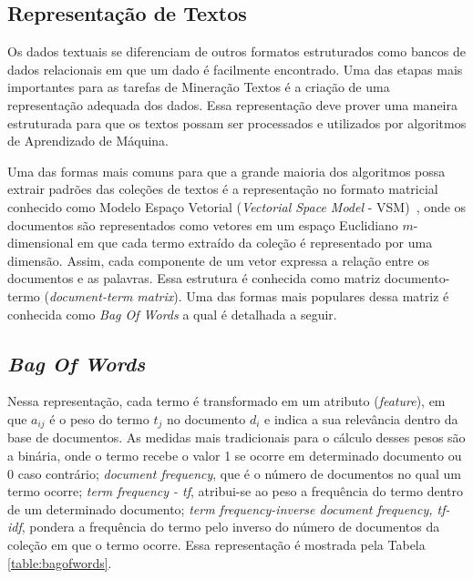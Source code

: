 \subsection*{Representação de Textos} 
\label{section:RepTextos}

Os dados textuais se diferenciam de outros formatos estruturados como bancos de dados relacionais em que um dado é facilmente encontrado. Uma das etapas mais importantes para as tarefas de Mineração Textos é a criação de uma representação adequada dos dados. Essa representação deve prover uma maneira estruturada para que os textos possam ser processados e utilizados por algoritmos de Aprendizado de Máquina. 




Uma das formas mais comuns para que a grande maioria dos algoritmos possa extrair padrões das coleções de textos é a representação no formato matricial conhecido como Modelo Espaço Vetorial (\textit{Vectorial Space Model} - VSM)~\cite{Rezende2003}, onde os documentos são representados como vetores em um espaço Euclidiano $m$-dimensional em que cada termo extraído da coleção é representado por uma dimensão. Assim, cada componente de um vetor expressa a relação entre os documentos e as palavras. Essa estrutura é conhecida como matriz documento-termo (\textit{document-term matrix}). Uma das formas mais populares dessa matriz é conhecida como \textit{Bag Of Words} a qual é detalhada a seguir.
	

\subsection*{\textit{Bag Of Words}}
		
Nessa representação, cada termo é transformado em um atributo  (\textit{feature}), em que $a_{ij}$ é o peso do termo $t_j$ no documento $d_i$ e indica a sua relevância dentro da base de documentos. As medidas mais tradicionais para o cálculo desses pesos são a binária, onde o termo recebe o valor 1 se ocorre em determinado documento ou 0 caso contrário; \textit{document frequency}, que é o número de documentos no qual um termo ocorre; \textit{term frequency - tf}, atribui-se ao peso a frequência do termo dentro de um determinado documento; \textit{term frequency-inverse document frequency, tf-idf}, pondera a frequência do termo pelo inverso do número de documentos da coleção em que o termo ocorre.
Essa representação é mostrada pela Tabela \ref{table:bagofwords}.

